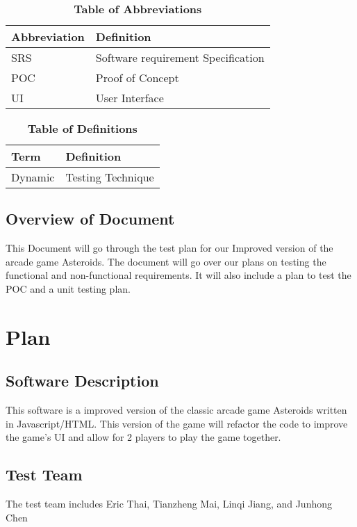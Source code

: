 \documentclass[12pt, titlepage]{article}
\begin{document}
\begin{table}[hbp]
\caption{\textbf{Table of Abbreviations}} \label{Table}

\begin{tabularx}{\textwidth}{p{3cm}X}
\toprule
\textbf{Abbreviation} & \textbf{Definition} \\
\midrule
SRS & Software requirement Specification\\
POC & Proof of Concept\\
UI & User Interface\\
\bottomrule
\end{tabularx}

\end{table}

\begin{table}[!htbp]
\caption{\textbf{Table of Definitions}} \label{Table}

\begin{tabularx}{\textwidth}{p{3cm}X}
\toprule
\textbf{Term} & \textbf{Definition}\\
\midrule
Dynamic & Testing Technique\\

\bottomrule
\end{tabularx}
\end{table}	

\subsection{Overview of Document}
This Document will go through the test plan for our Improved version of the arcade game Asteroids. The document will go over our plans on testing the functional and non-functional requirements. It will also include a plan to test the POC and a unit testing plan.

\section{Plan}
	
\subsection{Software Description}
This software is a improved version of the classic arcade game Asteroids written in Javascript/HTML. This version of the game will refactor the code to improve the game's UI and allow for 2 players to play the game together.

\subsection{Test Team}
The test team includes Eric Thai,  Tianzheng Mai, Linqi Jiang, and Junhong Chen
\end{document}
